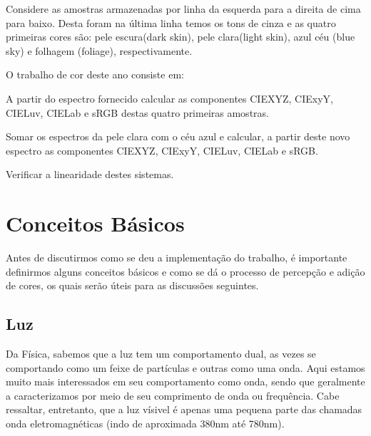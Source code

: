 \documentclass[a4paper,10pt]{report}
\begin{document}
\par
Considere as amostras armazenadas por linha da esquerda para a direita de cima
para baixo.  Desta foram na última linha temos os tons de cinza e as quatro
primeiras cores são: pele escura(dark skin), pele clara(light skin), azul céu
(blue sky) e folhagem (foliage), respectivamente.  

\par
O trabalho de cor deste ano consiste em:
\begin{list}{:~}{}
\item A partir do espectro fornecido calcular as componentes CIEXYZ,
CIExyY, CIELuv, CIELab e sRGB destas quatro primeiras amostras.
\item Somar os espectros da pele clara com o céu azul e calcular, a partir deste
novo espectro as componentes CIEXYZ, CIExyY, CIELuv, CIELab e sRGB.
\item Verificar a linearidade destes sistemas.
\end{list}

\section{Conceitos Básicos}
\par
Antes de discutirmos como se deu a implementação do trabalho, é importante
definirmos alguns conceitos básicos e como se dá o processo de percepção e
adição de cores, os quais serão úteis para as discussões seguintes.

\subsection{Luz}
\par
Da Física, sabemos que a luz tem um comportamento dual, as vezes se comportando
como um feixe de partículas e outras como uma onda. Aqui estamos muito mais
interessados em seu comportamento como onda, sendo que geralmente a
caracterizamos por meio de seu comprimento de onda ou frequência. Cabe
ressaltar, entretanto, que a luz vísivel é apenas uma pequena parte das
chamadas onda eletromagnéticas (indo de aproximada 380nm até 780nm).
\end{document}
